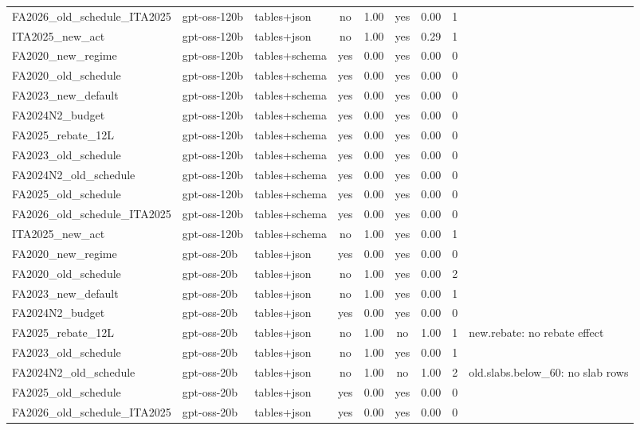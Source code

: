 \begin{table}[t]
\begin{tabular}{lllcrcrrl}
FA2026\_old\_schedule\_ITA2025 & gpt-oss-120b & tables+json & no & 1.00 & yes & 0.00 & 1 &  \\
ITA2025\_new\_act & gpt-oss-120b & tables+json & no & 1.00 & yes & 0.29 & 1 &  \\
FA2020\_new\_regime & gpt-oss-120b & tables+schema & yes & 0.00 & yes & 0.00 & 0 &  \\
FA2020\_old\_schedule & gpt-oss-120b & tables+schema & yes & 0.00 & yes & 0.00 & 0 &  \\
FA2023\_new\_default & gpt-oss-120b & tables+schema & yes & 0.00 & yes & 0.00 & 0 &  \\
FA2024N2\_budget & gpt-oss-120b & tables+schema & yes & 0.00 & yes & 0.00 & 0 &  \\
FA2025\_rebate\_12L & gpt-oss-120b & tables+schema & yes & 0.00 & yes & 0.00 & 0 &  \\
FA2023\_old\_schedule & gpt-oss-120b & tables+schema & yes & 0.00 & yes & 0.00 & 0 &  \\
FA2024N2\_old\_schedule & gpt-oss-120b & tables+schema & yes & 0.00 & yes & 0.00 & 0 &  \\
FA2025\_old\_schedule & gpt-oss-120b & tables+schema & yes & 0.00 & yes & 0.00 & 0 &  \\
FA2026\_old\_schedule\_ITA2025 & gpt-oss-120b & tables+schema & yes & 0.00 & yes & 0.00 & 0 &  \\
ITA2025\_new\_act & gpt-oss-120b & tables+schema & no & 1.00 & yes & 0.00 & 1 &  \\
FA2020\_new\_regime & gpt-oss-20b & tables+json & yes & 0.00 & yes & 0.00 & 0 &  \\
FA2020\_old\_schedule & gpt-oss-20b & tables+json & no & 1.00 & yes & 0.00 & 2 &  \\
FA2023\_new\_default & gpt-oss-20b & tables+json & no & 1.00 & yes & 0.00 & 1 &  \\
FA2024N2\_budget & gpt-oss-20b & tables+json & yes & 0.00 & yes & 0.00 & 0 &  \\
FA2025\_rebate\_12L & gpt-oss-20b & tables+json & no & 1.00 & no & 1.00 & 1 & new.rebate: no rebate effect \\
FA2023\_old\_schedule & gpt-oss-20b & tables+json & no & 1.00 & yes & 0.00 & 1 &  \\
FA2024N2\_old\_schedule & gpt-oss-20b & tables+json & no & 1.00 & no & 1.00 & 2 & old.slabs.below\_60: no slab rows \\
FA2025\_old\_schedule & gpt-oss-20b & tables+json & yes & 0.00 & yes & 0.00 & 0 &  \\
FA2026\_old\_schedule\_ITA2025 & gpt-oss-20b & tables+json & yes & 0.00 & yes & 0.00 & 0 &  \\

\end{tabular}
\end{table}
